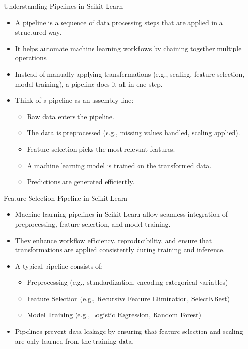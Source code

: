 \documentclass[11pt]{beamer}
\begin{document}
\begin{frame}{Understanding Pipelines in Scikit-Learn}
    \begin{itemize}
        \item A pipeline is a sequence of data processing steps that are applied in a structured way.
        \item It helps automate machine learning workflows by chaining together multiple operations.
        \item Instead of manually applying transformations (e.g., scaling, feature selection, model training), a pipeline does it all in one step.
        \item Think of a pipeline as an assembly line: 
        \begin{itemize}
            \item Raw data enters the pipeline.
            \item The data is preprocessed (e.g., missing values handled, scaling applied).
            \item Feature selection picks the most relevant features.
            \item A machine learning model is trained on the transformed data.
            \item Predictions are generated efficiently.
        \end{itemize}
    \end{itemize}
\end{frame}
\begin{frame}{Feature Selection Pipeline in Scikit-Learn}
    \begin{itemize}
        \item Machine learning pipelines in Scikit-Learn allow seamless integration of preprocessing, feature selection, and model training.
        \item They enhance workflow efficiency, reproducibility, and ensure that transformations are applied consistently during training and inference.
        \item A typical pipeline consists of:
        \begin{itemize}
            \item Preprocessing (e.g., standardization, encoding categorical variables)
            \item Feature Selection (e.g., Recursive Feature Elimination, SelectKBest)
            \item Model Training (e.g., Logistic Regression, Random Forest)
        \end{itemize}
        \item Pipelines prevent data leakage by ensuring that feature selection and scaling are only learned from the training data.
    \end{itemize}
\end{frame}
\end{document}
